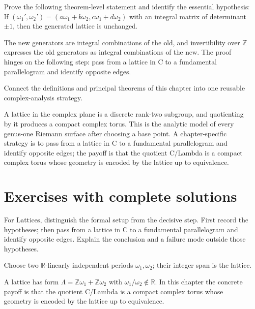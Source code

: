 \begin{problem}\label{prob:iv27-problem-11}
Prove the following theorem-level statement and identify the essential hypothesis: If $(\omega_1',\omega_2')=(a\omega_1+b\omega_2,c\omega_1+d\omega_2)$ with an integral matrix of determinant $\pm1$, then the generated lattice is unchanged.
\end{problem}
\begin{solution}
The new generators are integral combinations of the old, and invertibility over $\mathbb Z$ expresses the old generators as integral combinations of the new. The proof hinges on the following step: pass from a lattice in C to a fundamental parallelogram and identify opposite edges.
\end{solution}

\begin{problem}\label{prob:iv27-problem-12}
Connect the definitions and principal theorems of this chapter into one reusable complex-analysis strategy.
\end{problem}
\begin{solution}
A lattice in the complex plane is a discrete rank-two subgroup, and quotienting by it produces a compact complex torus. This is the analytic model of every genus-one Riemann surface after choosing a base point. A chapter-specific strategy is to pass from a lattice in C to a fundamental parallelogram and identify opposite edges; the payoff is that the quotient C/Lambda is a compact complex torus whose geometry is encoded by the lattice up to equivalence.
\end{solution}

\section{Exercises with complete solutions}

\begin{exercise}\label{exr:iv27-01}
For Lattices, distinguish the formal setup from the decisive step. First record the hypotheses; then pass from a lattice in C to a fundamental parallelogram and identify opposite edges. Explain the conclusion and a failure mode outside those hypotheses.
\end{exercise}
\begin{hint}
Choose two \(\mathbb R\)-linearly independent periods \(\omega_1,\omega_2\); their integer span is the lattice.
\end{hint}
\begin{solution}
A lattice has form $\Lambda=\mathbb Z\omega_1+\mathbb Z\omega_2$ with $\omega_1/\omega_2\notin\mathbb R$. In this chapter the concrete payoff is that the quotient C/Lambda is a compact complex torus whose geometry is encoded by the lattice up to equivalence.
\end{solution}

